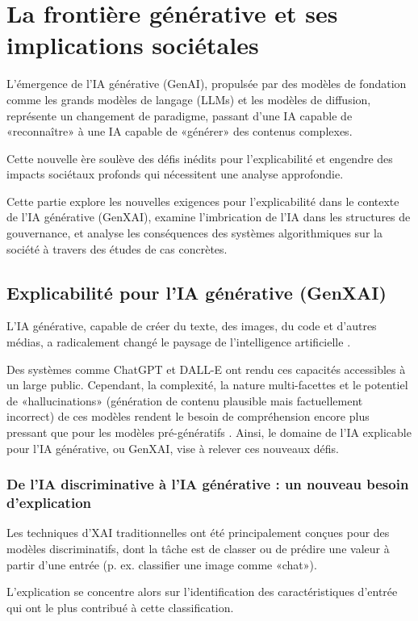 \part{La frontière générative et ses implications sociétales}
L'émergence de l'IA générative (GenAI), propulsée par des modèles de fondation comme les grands modèles de langage (LLMs) et les modèles de diffusion, représente un changement de paradigme, passant d'une IA capable de «reconnaître» à une IA capable de «générer» des contenus complexes.

Cette nouvelle ère soulève des défis inédits pour l'explicabilité et engendre des impacts sociétaux profonds qui nécessitent une analyse approfondie.

Cette partie explore les nouvelles exigences pour l'explicabilité dans le contexte de l'IA générative (GenXAI), examine l'imbrication de l'IA dans les structures de gouvernance, et analyse les conséquences des systèmes algorithmiques sur la société à travers des études de cas concrètes.
\vspace{2em}

\chapter{Explicabilité pour l'IA générative (GenXAI)}
L'IA générative, capable de créer du texte, des images, du code et d'autres médias, a radicalement changé le paysage de l'intelligence artificielle \citep{Gozalo-Brizuela2023, Cao2023}.

Des systèmes comme ChatGPT \citet{Achiam2023} et DALL-E \citet{Betker2023} ont rendu ces capacités accessibles à un large public. Cependant, la complexité, la nature multi-facettes et le potentiel de «hallucinations» (génération de contenu plausible mais factuellement incorrect) de ces modèles rendent le besoin de compréhension encore plus pressant que pour les modèles pré-génératifs \citet{Schneider2024b}. Ainsi, le domaine de l'IA explicable pour l'IA générative, ou GenXAI, vise à relever ces nouveaux défis.
\section{De l'IA discriminative à l'IA générative : un nouveau besoin d'explication}
Les techniques d'XAI traditionnelles ont été principalement conçues pour des modèles discriminatifs, dont la tâche est de classer ou de prédire une valeur à partir d'une entrée (p. ex. classifier une image comme «chat»). 

L'explication se concentre alors sur l'identification des caractéristiques d'entrée qui ont le plus contribué à cette classification.


